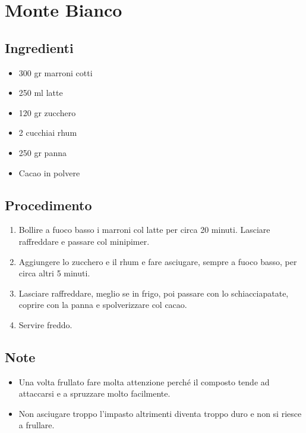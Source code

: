\section{Monte Bianco}
\subsection{Ingredienti}
\begin{itemize}
\item 300 gr marroni cotti  
\item 250 ml latte  
\item 120 gr zucchero  
\item 2 cucchiai rhum  
\item 250 gr panna  
\item Cacao in polvere
\end{itemize}
\subsection{Procedimento}
\begin{enumerate}
\item  Bollire a fuoco basso i marroni col latte per circa 20 minuti. Lasciare raffreddare e passare col minipimer.  
\item  Aggiungere lo zucchero e il rhum e fare asciugare, sempre a fuoco basso, per circa altri 5 minuti.  
\item  Lasciare raffreddare, meglio se in frigo, poi passare con lo schiacciapatate, coprire con la panna e spolverizzare col cacao.  
\item  Servire freddo.
\end{enumerate}
\subsection{Note}
\begin{itemize}
\item Una volta frullato fare molta attenzione perché il composto tende ad attaccarsi e a spruzzare molto facilmente.   
\item Non asciugare troppo l'impasto altrimenti diventa troppo duro e non si riesce a frullare. 
\end{itemize}
